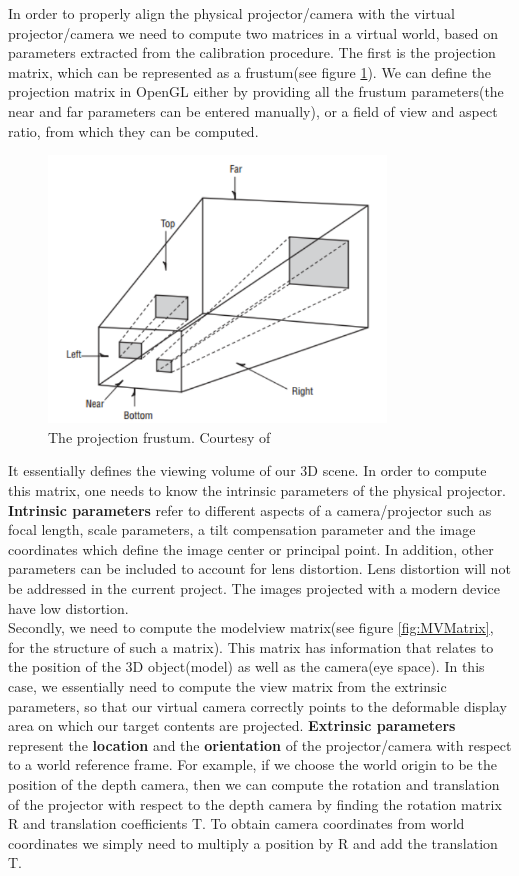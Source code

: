 \documentclass[]{article}
\begin{document}
In order to properly align the physical projector/camera with the virtual projector/camera we need to compute two matrices in a virtual world, based on parameters extracted from the calibration procedure. The first is the projection matrix, which can be represented as a frustum(see figure \ref{fig:Frustum}). We can define the projection matrix in OpenGL either by providing all the frustum parameters(the near and far parameters can be entered manually), or a field of view and aspect ratio, from which they can be computed. 
\begin{figure}[hbtp]
    \centering
    \includegraphics[width=0.8\textwidth]{figures/Frustum.PNG}
    \caption{The projection frustum. Courtesy of \cite{superbible}}
    \label{fig:Frustum}
\end{figure}

It essentially defines the viewing volume of our 3D scene. In order to compute this matrix, one needs to know the intrinsic parameters of the physical projector.
\textbf{Intrinsic parameters} refer to different aspects of a camera/projector such as focal length, scale parameters, a tilt compensation parameter and the image coordinates which define the image center or principal point. In addition, other parameters can be included to account for lens distortion. Lens distortion will not be addressed in the current project. The images projected with a modern device have low distortion.\\

Secondly, we need to compute the modelview matrix(see figure \ref{fig:MVMatrix}, for the structure of such a matrix). This matrix has information that relates to the position of the 3D object(model) as well as the camera(eye space). In this case, we essentially need to compute the view matrix from the extrinsic parameters, so that our virtual camera correctly points to the deformable display area on which our target contents are projected. \textbf{Extrinsic parameters} represent the \textbf{location} and the \textbf{orientation} of the projector/camera with respect to a world reference frame. For example, if we choose the world origin to be the position of the depth camera, then we can compute the rotation and translation of the projector with respect to the depth camera by finding the rotation matrix R and translation coefficients T. To obtain camera coordinates from world coordinates we simply need to multiply a position by R and add the translation T.
\end{document}
